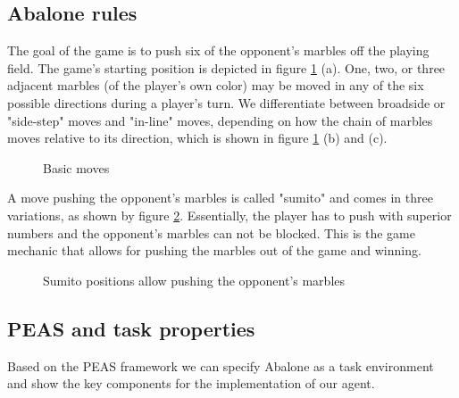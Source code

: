 \subsection{Abalone rules}
The goal of the game is to push six of the opponent's marbles off the playing field. The game's starting position is depicted in figure \ref{basics} (a). One, two, or three adjacent marbles (of the player's own color) may be moved in any of the six possible directions during a player's turn. We differentiate between broadside or "side-step" moves and "in-line" moves, depending on how the chain of marbles moves relative to its direction, which is shown in figure \ref{basics} (b) and (c).

\begin{figure}[!h]
    \centering
    \hfill
    \hfill
    \caption{Basic moves \cite{abalone_sa_abalone_nodate}}
    \label{basics}
\end{figure}

A move pushing the opponent's marbles is called "sumito" and comes in three variations, as shown by figure \ref{sumito}. Essentially, the player has to push with superior numbers and the opponent's marbles can not be blocked. This is the game mechanic that allows for pushing the marbles out of the game and winning.

\begin{figure}[!h]
    \centering
    \hfill
    \hfill
    \caption{Sumito positions allow pushing the opponent's marbles \cite{abalone_sa_abalone_nodate}}
    \label{sumito}
\end{figure}

\subsection{PEAS and task properties}
Based on the PEAS framework we can specify Abalone as a task environment and show the key components for the implementation of our agent. \cite[p.107]{russell_artificial_2021}

